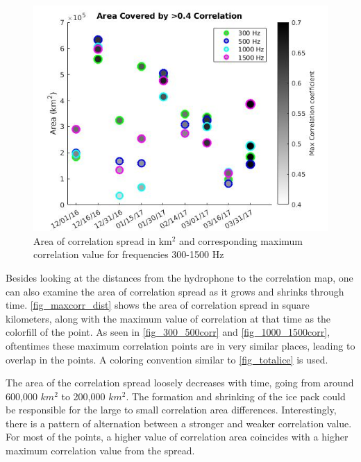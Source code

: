 
\begin{figure}[p]
\centering
\includegraphics[scale=0.5]{Figures/area_cov_by_>0.4_noisland.jpg}
\caption{Area of correlation spread in km$^{2}$ and corresponding maximum correlation value for frequencies 300-1500 Hz}
\label{fig_maxcorr_dist}
\end{figure}


Besides looking at the distances from the hydrophone to the correlation map, one can also examine the area of correlation spread as it grows and shrinks through time. \autoref{fig_maxcorr_dist} shows the area of correlation spread in square kilometers, along with the maximum value of correlation at that time as the colorfill of the point. As seen in \autoref{fig_300_500corr} and \autoref{fig_1000_1500corr}, oftentimes these maximum correlation points are in very similar places, leading to overlap in the points. A coloring convention similar to \autoref{fig_totalice} is used.

The area of the correlation spread loosely decreases with time, going from around 600,000 $km^{2}$ to 200,000 $km^{2}$. The formation and shrinking of the ice pack could be responsible for the large to small correlation area differences. Interestingly, there is a pattern of alternation between a stronger and weaker correlation value. For most of the points, a higher value of correlation area coincides with a higher maximum correlation value from the spread.

